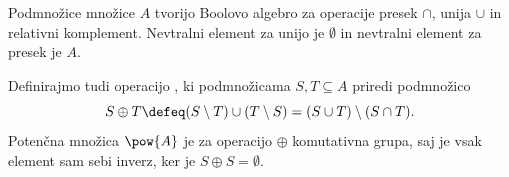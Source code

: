 Podmnožice množice $A$ tvorijo Boolovo algebro za operacije presek $\cap$, unija $\cup$ in relativni komplement. Nevtralni element za unijo je $\emptyset$ in nevtralni element za presek je $A$.

Definirajmo tudi operacijo , ki podmnožicama $S, T \subseteq A$ priredi podmnožico
%
\begin{equation*}
  S \oplus T \defeq (S \setminus T) \cup (T \setminus S) = (S \cup T) \setminus (S \cap T).
\end{equation*}
%
Potenčna množica $\pow{A}$ je za operacijo $\oplus$ komutativna grupa, saj je vsak element sam sebi inverz, ker je $S \oplus S = \emptyset$.
